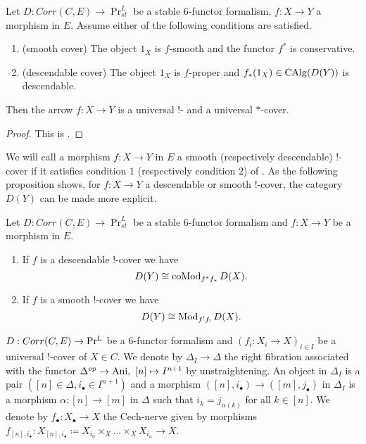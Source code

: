 \begin{proposition}\label{smooth and descendable D-covers}
Let $D : Corr(C,E) \to \Pr_{st}^L$ be a stable $6$-functor formalism, $f:X\to Y $ a morphism in $E$. Assume either of the following conditions are satisfied.
\begin{enumerate}
    \item (smooth cover) The object $1_X$ is $f$-smooth and the functor $f^*$ is conservative.
    \item (descendable cover) The object $1_X$ is $f$-proper and $f_*(1_X)\in \operatorname{CAlg}(D(Y))$ is descendable.
\end{enumerate}
Then the arrow $f : X \to Y$ is a universal $!$- and a universal $*$-cover.
\end{proposition}
\begin{proof}
This is \Cite[Proposition 6.18, Proposition 6.19] {6functors}.
\end{proof}
We will call a morphism $f:X\to Y $ in $E$ a smooth (respectively descendable) $!$-cover if it satisfies  condition $1$ (respectively condition $2$) of .
As the following proposition shows, for $f: X \to Y$ a descendable or smooth $!$-cover, the category $D(Y)$ can be made more explicit.

\begin{proposition}\Cite[Proposition 3.1.27]{camargo2024analytic}\label{modulcomodul}
    Let $D : Corr(C,E) \to \Pr_{st}^L$ be a stable $6$-functor formalism and  $f: X \to Y$ be a morphism in $E$. 
 \begin{enumerate}   
  \item   If $f$ is a descendable $!$-cover we have 
    \[
    D(Y)\cong \operatorname{coMod}_{f^*f_*}D(X).
    \]
 \item    If $f$ is a smooth $!$-cover we have 
    \[
    D(Y)\cong \operatorname{Mod}_{f^!f_!}D(X).
    \]
\end{enumerate}
\end{proposition}

\begin{definition}\Cite[Definition A.4.5]{heyer20246}
$D : Corr(C,E) \to \operatorname{Pr^{L}}$ be a $6$-functor formalism and  $(f_i: {X}_i\to X)_{i\in I}$ be a universal $!$-cover of $X\in C$. We denote by $\Delta_I \to \Delta$ the right fibration associated with the functor $\Delta^{op}\to \operatorname{Ani} ,\  [n]\mapsto I^{n+1}$ by unstraightening. An object in $\Delta_I$ is a pair $([n]\in \Delta,i_\bullet\in I^{n+1})$ and a morphism $([n],i_\bullet)\to ([m],j_\bullet) $ in $\Delta_I$ is a morphism $\alpha : [n] \to [m]$ in $\Delta$ such that $i_k=j_{\alpha(k)}$ for all $k\in [n]$. We denote by $f_{\bullet} : X_{\bullet}\to X$ the Cech-nerve given by morphisms $f_{[n],i_\bullet} : X_{[n],i_\bullet}\coloneqq X_{i_0}\times_X ... \times_X X_{i_n} \to X $.
\end{definition}


